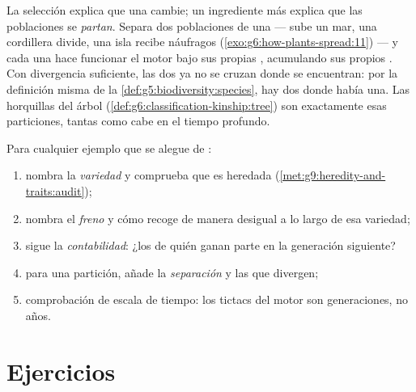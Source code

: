 \begin{proposition}\label{prop:g9:how-species-change:speciation}
La selección explica que una  cambie; un ingrediente más
explica que las poblaciones se \emph{partan}. Separa dos poblaciones de
una  --- sube un mar, una cordillera divide, una isla recibe
náufragos (\cref{exo:g6:how-plants-spread:11}) --- y cada una hace
funcionar el motor bajo sus propias , acumulando sus propios
. Con divergencia suficiente, las dos ya no se cruzan donde se
encuentran: por la definición misma de la
\cref{def:g5:biodiversity:species}, hay dos  donde había una.
Las horquillas del árbol (\cref{def:g6:classification-kinship:tree})
son exactamente esas particiones, tantas como cabe en el tiempo
profundo.
\end{proposition}
\admitted

\begin{method}\label{met:g9:how-species-change:run}
Para cualquier ejemplo que se alegue de :
\begin{enumerate}
  \item nombra la \emph{variedad} y comprueba que es heredada
        (\cref{met:g9:heredity-and-traits:audit});
  \item nombra el \emph{freno} y cómo recoge de manera desigual a lo
        largo de esa variedad;
  \item sigue la \emph{contabilidad}: ¿los  de quién ganan parte
        en la generación siguiente?
  \item para una partición, añade la \emph{separación} y las
         que divergen;
  \item comprobación de escala de tiempo: los tictacs del motor son
        generaciones, no años.
\end{enumerate}
\end{method}

\section{Ejercicios}

